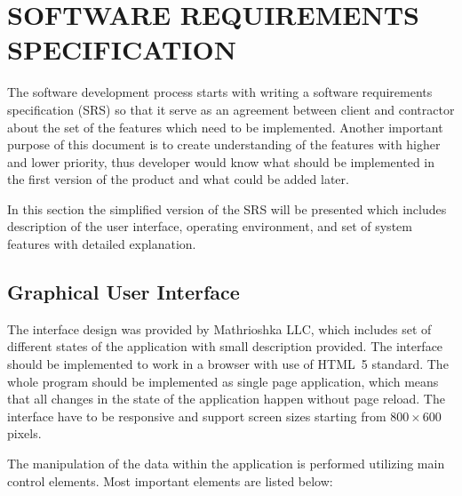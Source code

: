 \section{SOFTWARE REQUIREMENTS SPECIFICATION}

The software development process starts with writing a software requirements specification (SRS)
so that
it serve as an agreement between client and contractor about the set of the
features which need to be implemented. Another important purpose of this document
is to create understanding of the features with higher and lower priority, thus developer
would know what should be implemented in the first version of the product and what could
be added later.

In this section the simplified version of the SRS will be presented which includes description
of the user interface, operating environment, and set of system features with detailed
explanation.

\subsection{Graphical User Interface}

The interface design was provided by Mathrioshka LLC, which includes set of different states
of the application with small description provided. The interface should be implemented
to work in a browser with use of HTML~5 standard. The whole program should be implemented
as single page application, which means that all changes in the state of the application
happen without page reload. The interface have to be responsive and support screen sizes
starting from $800 \times 600$ pixels.

The manipulation of the data within the application is performed utilizing main control elements.
Most important elements are listed below:


